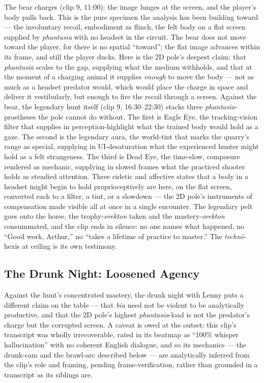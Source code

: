 \documentclass{article}
\begin{document}
The bear charges (clip 9, 11:00): the image lunges at the screen, and the player's body pulls back. This is the pure specimen the analysis has been building toward — the involuntary recoil, embodiment as flinch, the felt body on a flat screen supplied by \textit{phantasia} with no headset in the circuit. The bear does not move toward the player, for there is no spatial ``toward''; the flat image advances within its frame, and still the player ducks. Here is the 2D pole's deepest claim: that \textit{phantasia} scales to the gap, supplying what the medium withholds, and that at the moment of a charging animal it supplies \textit{enough} to move the body — not as much as a headset predator would, which would place the charge in space and deliver it vestibularly, but enough to fire the recoil through a screen. Against the bear, the legendary hunt itself (clip 9, 16:30–22:30) stacks three \textit{phantasia}-prostheses the pole cannot do without. The first is Eagle Eye, the tracking-vision filter that supplies in perception-highlight what the trained body would hold as a gaze. The second is the legendary aura, the world-tint that marks the quarry's range as special, supplying in UI-desaturation what the experienced hunter might hold as a felt strangeness. The third is Dead Eye, the time-slow, composure rendered as mechanic, supplying in slowed frames what the practiced shooter holds as steadied attention. Three eidetic and affective states that a body in a headset might begin to hold proprioceptively are here, on the flat screen, converted each to a filter, a tint, or a slowdown — the 2D pole's instruments of compensation made visible all at once in a single encounter. The legendary pelt goes onto the horse, the trophy-\textit{orekton} taken and the mastery-\textit{orekton} consummated, and the clip ends in silence: no one names what happened, no ``Good work, Arthur,'' no ``takes a lifetime of practice to master.'' The \textit{technē}-hexis at ceiling is its own testimony.

\bigskip

\subsection*{The Drunk Night: Loosened Agency}

Against the hunt's concentrated mastery, the drunk night with Lenny puts a different claim on the table — that \textit{bia} need not be violent to be analytically productive, and that the 2D pole's highest \textit{phantasia}-load is not the predator's charge but the corrupted screen. A caveat is owed at the outset: this clip's transcript was wholly irrecoverable, rated in its beatmap as ``100\% whisper hallucination'' with no coherent English dialogue, and so its mechanics — the drunk-cam and the brawl-arc described below — are analytically inferred from the clip's role and framing, pending frame-verification, rather than grounded in a transcript as its siblings are.
\end{document}
